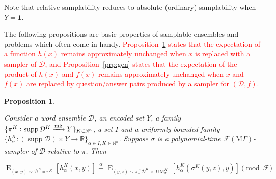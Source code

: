 \documentclass[11pt]{article}
\numberwithin{equation}{section}
\theoremstyle{definition}
\theoremstyle{plain}
\newtheorem{proposition}{Proposition}[section]
\DeclareMathOperator{\Supp}{supp}
\DeclareMathOperator{\E}{E}
\DeclareMathOperator{\UM}{UM}
\newcommand{\Nats}{\mathbb{N}}
\newcommand{\Reals}{\mathbb{R}}
\newcommand{\Dist}{\mathcal{D}}
\newcommand{\MGrow}{\mathrm{M}\Gamma}
\newcommand{\Fall}{\mathcal{F}}
\newcommand{\EMG}{\Fall(\MGrow)}
\newcommand{\Markov}{\xrightarrow{\textnormal{mk}}}
\begin{document}
Note that relative samplability reduces to absolute (ordinary) samplability when $Y=\bm{1}$.

The following propositions are basic properties of samplable ensembles and problems which often come in handy. \textcolor{red}{Proposition~\ref{prp:smp} states that the expectation of a function $h(x)$ remains approximately unchanged when $x$ is replaced with a sampler of $\Dist$, and Proposition~\ref{prp:gen} states that the expectation of the product of $h(x)$ and $f(x)$ remains approximately unchanged when $x$ and $f(x)$ are replaced by question/answer pairs produced by a sampler for $(\Dist,f)$.}

\begin{samepage}
\begin{proposition}
\label{prp:smp}

Consider a word ensemble $\Dist$, an encoded set $Y$, a family\\ $\{\pi^K: \Supp \Dist^{K} \Markov Y\}_{K \in \Nats^n}$, a set ${I}$ and a uniformly bounded family\\ $\{h_\alpha^K: (\Supp \Dist) \times Y \rightarrow \Reals\}_{\alpha \in I, K \in \Nats^n}$. Suppose $\sigma$ is a polynomial-time $\EMG$-sampler of $\Dist$ relative to $\pi$. Then

\begin{equation}
\label{eqn:prp__smp}
\E_{(x,y) \sim \Dist^{K} \ltimes \pi^K}[h_\alpha^K(x,y)] \overset{\alpha}{\equiv} \E_{(y,z) \sim \pi_*^K\Dist^{K} \times \UM_\sigma^K}[h_\alpha^K(\sigma^K(y,z),y)] \pmod \Fall
\end{equation}

\end{proposition}
\end{samepage}
\end{document}
